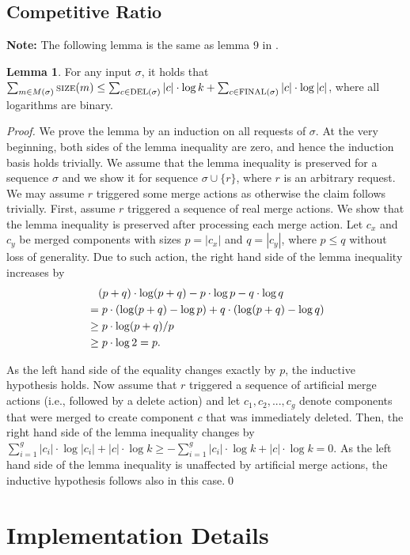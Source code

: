 \documentclass[xcolor=dvipsnames, tikz, 12pt]{article}
\newcommand{\nl}{\newline}
\newcommand{\size}{\text{\scriptsize SIZE}}
\newcommand{\del}{\text{\scriptsize DEL}}
\newcommand{\final}{\text{\scriptsize FINAL}}
\theoremstyle{definition}
\newtheorem{lemma}[defi]{Lemma}
\begin{document}
	
\subsection{Competitive Ratio}

\textbf{Note:} The following lemma is the same as lemma 9 in \cite{Avin2015}.
\begin{lemma}
	\label{size_lemma}
	For any input $\sigma$, it holds that $\sum_{m\in M(\sigma)}\size{}(m)\leq\sum_{c\in\del(\sigma)}|c|\cdot \log k+\sum_{c\in\final(\sigma)}|c|\cdot\log|c|$, where all logarithms are binary.
\end{lemma}
\textit{Proof.} We prove the lemma by an induction on all requests of $\sigma$. At the very beginning, both sides of the lemma inequality are zero, and hence the induction basis holds trivially. We assume that the lemma inequality is preserved for a sequence $\sigma$ and we show it for sequence $\sigma\cup\{r\}$, where $r$ is an arbitrary request. We may assume $r$ triggered some merge actions as otherwise the claim follows trivially.\nl
First, assume $r$ triggered a sequence of real merge actions. We show that the lemma inequality is preserved after processing each merge action. Let $c_x$ and $c_y$ be merged components with sizes $p=|c_x|$ and $q=|c_y|$, where $p\leq q$ without loss of generality. Due to such action, the right hand side of the lemma inequality increases by
\begin{align*}	
&\text{\quad}(p+q)\cdot\log(p+q)-p\cdot\log p-q\cdot\log q\\
&=p\cdot(\log(p+q)-\log p)+q\cdot(\log(p+q)-\log q)\\
&\geq p\cdot\log(p+q)/p\\
&\geq p\cdot\log 2=p.
\end{align*}

As the left hand side of the equality changes exactly by $p$, the inductive hypothesis holds.\nl
Now assume that $r$ triggered a sequence of artificial merge actions (i.e., followed by a delete action) and let $c_1,c_2,...,c_g$ denote components that were merged to create component $c$ that was immediately deleted. Then, the right hand side of the lemma inequality changes by $\sum_{i=1}^g|c_i|\cdot\log|c_i|+|c|\cdot\log k\geq-\sum_{i=1}^g|c_i|\cdot\log k+|c|\cdot\log k=0$. As the left hand side of the lemma inequality is unaffected by artificial merge actions, the inductive hypothesis follows also in this case.\qed

\section{Implementation Details}
\label{implDetSection}
\end{document}
